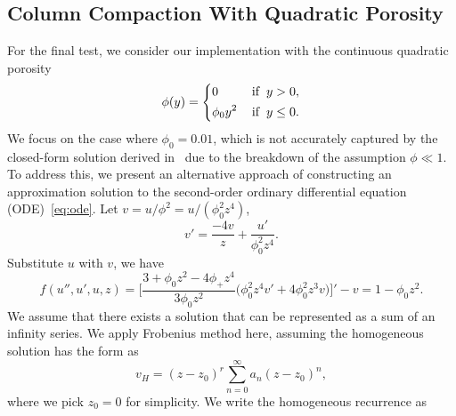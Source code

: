\subsection{Column Compaction With Quadratic Porosity}
For the final test, we consider our implementation with the continuous quadratic porosity 
					 \begin{equation}\label{eq:quadphi}
								\phi(y) = \left \{
										  \begin{alignedat}{2}
													 &0 \hspace{0.95cm} &&\text{if}\hspace{0.2cm}  y> 0,\\
													 &\phi_0y^2 \hspace{0.3cm} &&\text{if}\hspace{0.2cm} y\leq 0.
										  \end{alignedat}
										  \right.
					 \end{equation}
We focus on the case where $\phi_0 = 0.01$, which is not accurately captured by the
closed-form solution derived in~\cite{DegenerateDarcy} due to the breakdown of the assumption $\phi \ll 1$.
To address this, we present an alternative approach of constructing an approximation solution to the
second-order ordinary differential equation (ODE)~\eqref{eq:ode}. 
\iffalse
Let $v = u/\phi^2 = u/(\phi_0^2 z^4)$,
\begin{equation}
		  v' = \frac{-4v}{z} + \frac{u'}{\phi_0^2 z^4}.
\end{equation}
Substitute $u$ with $v$, we have 
\begin{equation}\label{eq:nonhomoode}
		  f(u'',u',u,z) = \bigg[ \frac{3+\phi_0z^2 - 4\phi_+z^4}{3\phi_0z^2}\big(\phi_0^2 z^4 v' + 4\phi_0^2 z^3 v\big) \bigg]' - v = 1 - \phi_0z^2.
\end{equation}
We assume that there exists a solution that can be represented as a sum of 
an infinity series.
We apply Frobenius method here, assuming the homogeneous solution
has the form as
\begin{equation}\label{eq:homogenous}
v_H = (z-z_0)^r \sum_{n=0}^\infty a_n (z-z_0)^n,
\end{equation}
where we pick $z_0 = 0$ for simplicity. We write the homogeneous
recurrence as


